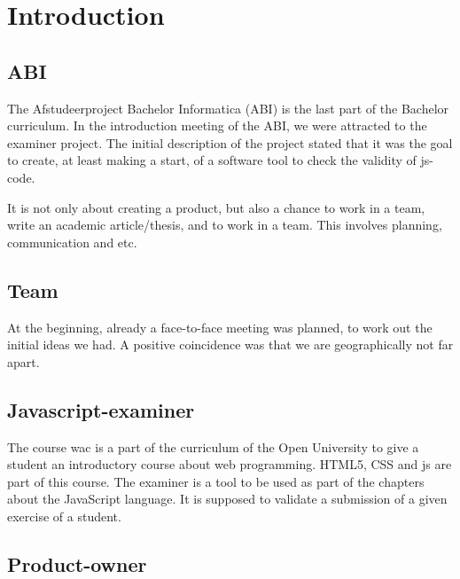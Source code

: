 \chapter{Introduction}



\section{ABI}

The Afstudeerproject Bachelor Informatica (ABI) is the last part of the Bachelor curriculum.
In the introduction meeting of the ABI, we were attracted to the \gls{examiner} project.
The initial description of the project stated that it was the goal to create,
at least making a start, of a software tool to check the validity
of \gls{js-code}.

It is not only about creating a product, but also a chance to work in a team, write an academic article/thesis, and to work in a team.
This involves planning, communication and etc.


\section{Team}
At the beginning, already a face-to-face meeting was planned, to work out the initial ideas we had.
A positive coincidence was that we are geographically not far apart.


\section{Javascript-examiner}
The course \gls{wac} is a part of the curriculum of the Open University to give
a student an introductory course about web programming.
HTML5, CSS and \gls{js} are part of this course.
The \gls{examiner} is a tool to be used as part of the chapters about the JavaScript language.
It is supposed to validate a submission of a given exercise of a student.


\section{Product-owner}

